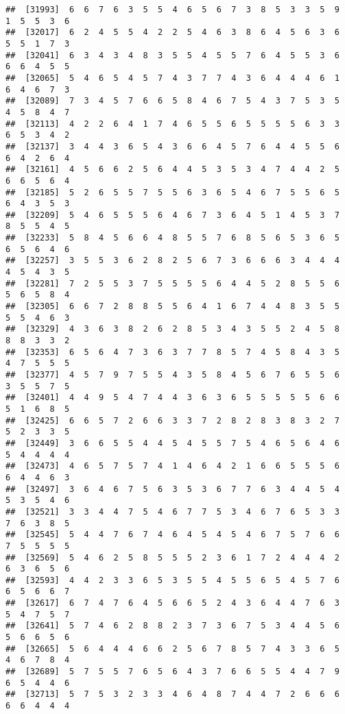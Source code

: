 \documentclass[
]{book}
\begin{document}
\begin{verbatim}
##  [31993]  6  6  7  6  3  5  5  4  6  5  6  7  3  8  5  3  3  5  9  1  5  5  3  6
##  [32017]  6  2  4  5  5  4  2  2  5  4  6  3  8  6  4  5  6  3  6  5  5  1  7  3
##  [32041]  6  3  4  3  4  8  3  5  5  4  5  5  7  6  4  5  5  3  6  6  6  4  5  5
##  [32065]  5  4  6  5  4  5  7  4  3  7  7  4  3  6  4  4  4  6  1  6  4  6  7  3
##  [32089]  7  3  4  5  7  6  6  5  8  4  6  7  5  4  3  7  5  3  5  4  5  8  4  7
##  [32113]  4  2  2  6  4  1  7  4  6  5  5  6  5  5  5  5  6  3  3  6  5  3  4  2
##  [32137]  3  4  4  3  6  5  4  3  6  6  4  5  7  6  4  4  5  5  6  6  4  2  6  4
##  [32161]  4  5  6  6  2  5  6  4  4  5  3  5  3  4  7  4  4  2  5  6  6  5  6  4
##  [32185]  5  2  6  5  5  7  5  5  6  3  6  5  4  6  7  5  5  6  5  6  4  3  5  3
##  [32209]  5  4  6  5  5  5  6  4  6  7  3  6  4  5  1  4  5  3  7  8  5  5  4  5
##  [32233]  5  8  4  5  6  6  4  8  5  5  7  6  8  5  6  5  3  6  5  6  5  6  4  6
##  [32257]  3  5  5  3  6  2  8  2  5  6  7  3  6  6  6  3  4  4  4  4  5  4  3  5
##  [32281]  7  2  5  5  3  7  5  5  5  5  6  4  4  5  2  8  5  5  6  5  6  5  8  4
##  [32305]  6  6  7  2  8  8  5  5  6  4  1  6  7  4  4  8  3  5  5  5  5  4  6  3
##  [32329]  4  3  6  3  8  2  6  2  8  5  3  4  3  5  5  2  4  5  8  8  8  3  3  2
##  [32353]  6  5  6  4  7  3  6  3  7  7  8  5  7  4  5  8  4  3  5  4  7  5  5  5
##  [32377]  4  5  7  9  7  5  5  4  3  5  8  4  5  6  7  6  5  5  6  3  5  5  7  5
##  [32401]  4  4  9  5  4  7  4  4  3  6  3  6  5  5  5  5  5  6  6  5  1  6  8  5
##  [32425]  6  6  5  7  2  6  6  3  3  7  2  8  2  8  3  8  3  2  7  5  2  3  3  5
##  [32449]  3  6  6  5  5  4  4  5  4  5  5  7  5  4  6  5  6  4  6  5  4  4  4  4
##  [32473]  4  6  5  7  5  7  4  1  4  6  4  2  1  6  6  5  5  5  6  6  4  4  6  3
##  [32497]  3  6  4  6  7  5  6  3  5  3  6  7  7  6  3  4  4  5  4  5  3  5  4  6
##  [32521]  3  3  4  4  7  5  4  6  7  7  5  3  4  6  7  6  5  3  3  7  6  3  8  5
##  [32545]  5  4  4  7  6  7  4  6  4  5  4  5  4  6  7  5  7  6  6  7  5  5  5  5
##  [32569]  5  4  6  2  5  8  5  5  5  2  3  6  1  7  2  4  4  4  2  6  3  6  5  6
##  [32593]  4  4  2  3  3  6  5  3  5  5  4  5  5  6  5  4  5  7  6  6  5  6  6  7
##  [32617]  6  7  4  7  6  4  5  6  6  5  2  4  3  6  4  4  7  6  3  5  4  7  5  7
##  [32641]  5  7  4  6  2  8  8  2  3  7  3  6  7  5  3  4  4  5  6  5  6  6  5  6
##  [32665]  5  6  4  4  4  6  6  2  5  6  7  8  5  7  4  3  3  6  5  4  6  7  8  4
##  [32689]  5  7  5  5  7  6  5  6  4  3  7  6  6  5  5  4  4  7  9  6  5  4  4  6
##  [32713]  5  7  5  3  2  3  3  4  6  4  8  7  4  4  7  2  6  6  6  6  6  4  4  4

\end{verbatim}
\end{document}
